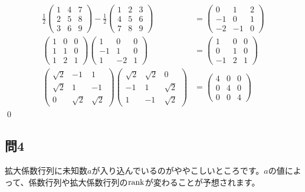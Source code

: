 \begin{align*}
\frac{1}{2}
\begin{pmatrix}
1 & 4 & 7 \\
2 & 5 & 8 \\
3 & 6 & 9
\end{pmatrix}
- \frac{1}{2}
\begin{pmatrix}
1 & 2 & 3 \\
4 & 5 & 6 \\
7 & 8 & 9
\end{pmatrix}
&=
\begin{pmatrix}
0 & 1 & 2 \\
-1 & 0 & 1 \\
-2 & -1 & 0
\end{pmatrix} \\
\begin{pmatrix}
1 & 0 & 0 \\
1 & 1 & 0 \\
1 & 2 & 1
\end{pmatrix}
\begin{pmatrix}
1 & 0 & 0 \\
-1 & 1 & 0 \\
1 & -2 & 1
\end{pmatrix}
&=
\begin{pmatrix}
1 & 0 & 0 \\
0 & 1 & 0 \\
-1 & 2 & 1
\end{pmatrix} \\
\begin{pmatrix}
\sqrt{2} & -1 & 1 \\
\sqrt{2} & 1 & -1 \\
0 & \sqrt{2} & \sqrt{2}
\end{pmatrix}
\begin{pmatrix}
\sqrt{2} & \sqrt{2} & 0 \\
-1 & 1 & \sqrt{2} \\
1 & -1 & \sqrt{2}
\end{pmatrix}
&= 
\begin{pmatrix}
4 & 0 & 0 \\
0 & 4 & 0 \\
0 & 0 & 4
\end{pmatrix}
\end{align*}
\qed

\subsection{問4}

拡大係数行列に未知数$a$が入り込んでいるのがややこしいところです。$a$の値によって、係数行列や拡大係数行列の$\operatorname{rank}$が変わることが予想されます。

